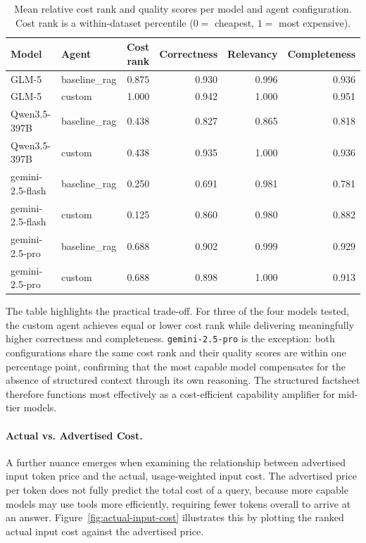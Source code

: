 \begin{table}[htbp]
\centering
\caption{Mean relative cost rank and quality scores per model and agent configuration.
         Cost rank is a within-dataset percentile ($0 =$ cheapest, $1 =$ most expensive).}
\label{tab:cost-quality}
\begin{tabular}{llrrrr}
\toprule
\textbf{Model} & \textbf{Agent} & \textbf{Cost rank} & \textbf{Correctness} & \textbf{Relevancy} & \textbf{Completeness} \\
\midrule
GLM-5             & baseline\_rag & 0.875 & 0.930 & 0.996 & 0.936 \\
GLM-5             & custom        & 1.000 & 0.942 & 1.000 & 0.951 \\
Qwen3.5-397B      & baseline\_rag & 0.438 & 0.827 & 0.865 & 0.818 \\
Qwen3.5-397B      & custom        & 0.438 & 0.935 & 1.000 & 0.936 \\
gemini-2.5-flash  & baseline\_rag & 0.250 & 0.691 & 0.981 & 0.781 \\
gemini-2.5-flash  & custom        & 0.125 & 0.860 & 0.980 & 0.882 \\
gemini-2.5-pro    & baseline\_rag & 0.688 & 0.902 & 0.999 & 0.929 \\
gemini-2.5-pro    & custom        & 0.688 & 0.898 & 1.000 & 0.913 \\
\bottomrule
\end{tabular}
\end{table}

The table highlights the practical trade-off. For three of the four models tested,
the custom agent achieves equal or lower cost rank while delivering meaningfully higher
correctness and completeness. \texttt{gemini-2.5-pro} is the exception: both
configurations share the same cost rank and their quality scores are within one
percentage point, confirming that the most capable model compensates for the absence
of structured context through its own reasoning. The structured factsheet therefore
functions most effectively as a cost-efficient capability amplifier for mid-tier models.

\paragraph{Actual vs. Advertised Cost.}
A further nuance emerges when examining the relationship between advertised input token price and the actual, usage-weighted input cost. The advertised price per token does not fully predict the total cost of a query, because more capable models may use tools more efficiently, requiring fewer tokens overall to arrive at an answer. Figure~\ref{fig:actual-input-cost} illustrates this by plotting the ranked actual input cost against the advertised price.

